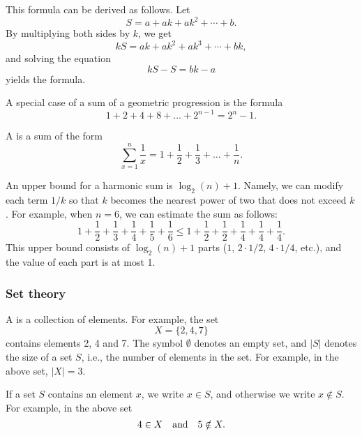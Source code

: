 This formula can be derived as follows. Let
\[ S = a + ak + ak^2 + \cdots + b .\]
By multiplying both sides by $k$, we get
\[ kS = ak + ak^2 + ak^3 + \cdots + bk,\]
and solving the equation
\[ kS-S = bk-a\]
yields the formula.

A special case of a sum of a geometric progression is the formula
\[1+2+4+8+\ldots+2^{n-1}=2^n-1.\]


A  is a sum of the form
\[ \sum_{x=1}^n \frac{1}{x} = 1+\frac{1}{2}+\frac{1}{3}+\ldots+\frac{1}{n}.\]

An upper bound for a harmonic sum is $\log_2(n)+1$.
Namely, we can
modify each term $1/k$ so that $k$ becomes
the nearest power of two that does not exceed $k$.
For example, when $n=6$, we can estimate
the sum as follows:
\[ 1+\frac{1}{2}+\frac{1}{3}+\frac{1}{4}+\frac{1}{5}+\frac{1}{6} \le
1+\frac{1}{2}+\frac{1}{2}+\frac{1}{4}+\frac{1}{4}+\frac{1}{4}.\]
This upper bound consists of $\log_2(n)+1$ parts
($1$, $2 \cdot 1/2$, $4 \cdot 1/4$, etc.),
and the value of each part is at most 1.

\subsubsection{Set theory}


A  is a collection of elements.
For example, the set
\[X=\{2,4,7\}\]
contains elements 2, 4 and 7.
The symbol $\emptyset$ denotes an empty set,
and $|S|$ denotes the size of a set $S$,
i.e., the number of elements in the set.
For example, in the above set, $|X|=3$.

If a set $S$ contains an element $x$,
we write $x \in S$,
and otherwise we write $x \notin S$.
For example, in the above set
\[4 \in X \hspace{10px}\textrm{and}\hspace{10px} 5 \notin X.\]

